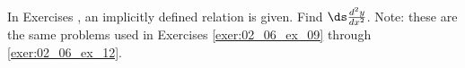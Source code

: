 {\noindent In Exercises}
{, an implicitly defined relation is given. Find $\ds \frac{d^2y}{dx^2}$. Note: these are the same problems used in Exercises \ref{exer:02_06_ex_09} through \ref{exer:02_06_ex_12}.
}
